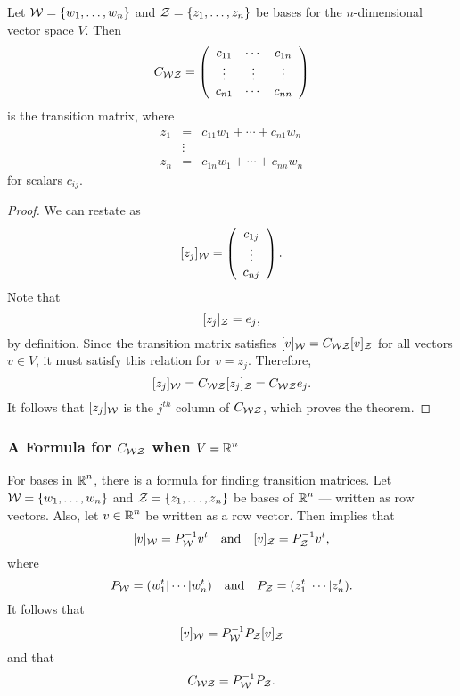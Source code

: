 \documentclass{ximera}
\begin{document}
\begin{thm}  \label{T:coordform}
Let ${\cal W}=\{w_1,\ldots,w_n\}$ and ${\cal Z}=\{z_1,\ldots,z_n\}$
be bases for the $n$-dimensional vector space $V$.
Then
\begin{equation} \label{e:coordform}
C_{{\cal W}{\cal Z}} =
\left(\begin{array}{ccc} c_{11} & \cdots & c_{1n} \\
\vdots & \vdots & \vdots \\
c_{n1} & \cdots & c_{nn} \end{array}\right)
\end{equation}
is the transition matrix, where
\begin{equation} \label{e:wtoz}
\begin{array}{ccc}
z_1 & = & c_{11}w_1 + \cdots + c_{n1}w_n \nonumber \\
    & \vdots &  \\
z_n & = & c_{1n}w_1 + \cdots + c_{nn}w_n \nonumber
\end{array}
\end{equation}
for scalars $c_{ij}$.
\end{thm}

\begin{proof}
We can restate  as
\[
[z_j]_{\cal W} = \left(\begin{array}{c} c_{1j} \\ \vdots \\c_{nj}
\end{array} \right).
\]
Note that
\[
[z_j]_{\cal Z} = e_j,
\]
by definition.  Since the transition matrix satisfies
$[v]_{\cal W} =  C_{{\cal W}{\cal Z}}[v]_{\cal Z}$ for all vectors
$v\in V$, it must satisfy this relation for $v=z_j$.  Therefore,
\[
[z_j]_{\cal W} = C_{{\cal W}{\cal Z}}[z_j]_{\cal Z} = C_{{\cal W}{\cal Z}}e_j.
\]
It follows that $[z_j]_{\cal W}$ is the $j^{th}$ column of
$C_{{\cal W}{\cal Z}}$, which proves the theorem.  \end{proof}

\subsubsection*{A Formula for $C_{\cal WZ}$ when $V=\mbox{$\Bbb{R}$}^n$}

For bases in $\mbox{$\Bbb{R}$}^n$, there is a formula for finding transition
matrices.  Let ${\cal W} =\{w_1,\ldots,w_n\}$
and ${\cal Z} = \{z_1,\ldots,z_n\}$ be bases of $\mbox{$\Bbb{R}$}^n$ --- written as row
vectors.
Also, let $v\in\mbox{$\Bbb{R}$}^n$ be written as a row vector.  Then 
implies that
\[
[v]_{\cal W} = P_{\cal W}^{-1} v^t \quad\mbox{and}\quad [v]_{\cal Z} = P_{\cal Z}^{-1} v^t,
\]
where
\[
P_{\cal W} = (w_1^t|\cdots|w_n^t) \quad\mbox{and}\quad  P_{\cal Z} = (z_1^t|\cdots|z_n^t).
\]
It follows that
\[
[v]_{\cal W} = P_{\cal W}^{-1} P_{\cal Z} [v]_{\cal Z}
\]
and that
\begin{equation} \label{e:coordformn}
C_{\cal WZ} = P_{\cal W}^{-1} P_{\cal Z}.
\end{equation}
\end{document}
